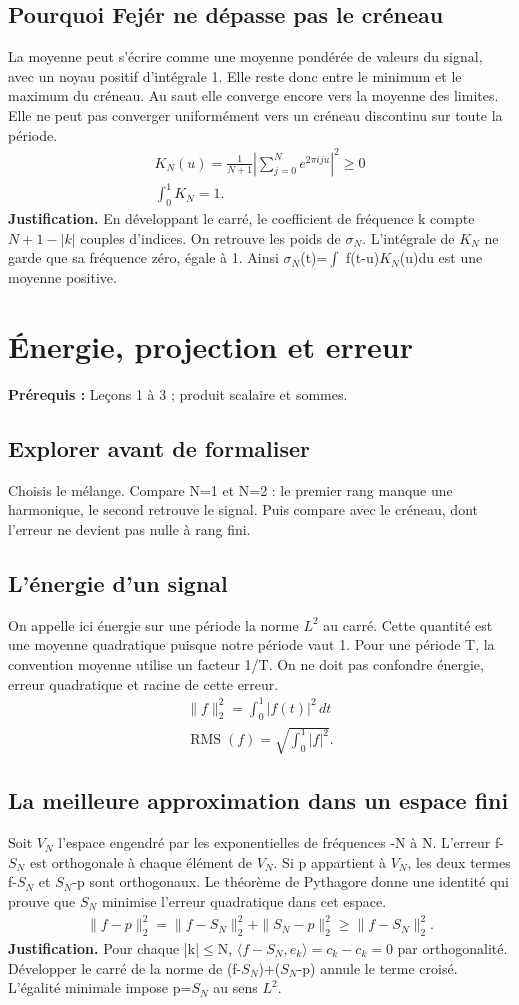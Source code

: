 \documentclass[11pt,a4paper]{article}
\begin{document}
\subsection{Pourquoi Fejér ne dépasse pas le créneau}
La moyenne peut s’écrire comme une moyenne pondérée de valeurs du signal, avec un noyau positif d’intégrale 1. Elle reste donc entre le minimum et le maximum du créneau. Au saut elle converge encore vers la moyenne des limites. Elle ne peut pas converger uniformément vers un créneau discontinu sur toute la période.
\[\begin{gathered}K_N(u)=\frac1{N+1}\left|\sum_{j=0}^{N}e^{2\pi iju}\right|^2\ge0\\\int_0^1K_N=1.\end{gathered}\]
\textbf{Justification.} En développant le carré, le coefficient de fréquence k compte $N+1-|k|$ couples d’indices. On retrouve les poids de $\sigma_N$. L’intégrale de $K_N$ ne garde que sa fréquence zéro, égale à 1. Ainsi $\sigma_N$(t)=$\int$ f(t-u)$K_N$(u)du est une moyenne positive.
\clearpage
\section{Énergie, projection et erreur}
\textbf{Prérequis :} Leçons 1 à 3 ; produit scalaire et sommes.
\subsection*{Explorer avant de formaliser}Choisis le mélange. Compare N=1 et N=2 : le premier rang manque une harmonique, le second retrouve le signal. Puis compare avec le créneau, dont l’erreur ne devient pas nulle à rang fini.
\subsection{L’énergie d’un signal}
On appelle ici énergie sur une période la norme $L^2$ au carré. Cette quantité est une moyenne quadratique puisque notre période vaut 1. Pour une période T, la convention moyenne utilise un facteur 1/T. On ne doit pas confondre énergie, erreur quadratique et racine de cette erreur.
\[\begin{gathered}\|f\|_2^2=\int_0^1|f(t)|^2\,dt\\ \operatorname{RMS}(f)=\sqrt{\int_0^1|f|^2}.\end{gathered}\]
\subsection{La meilleure approximation dans un espace fini}
Soit $V_N$ l’espace engendré par les exponentielles de fréquences -N à N. L’erreur f-$S_N$ est orthogonale à chaque élément de $V_N$. Si p appartient à $V_N$, les deux termes f-$S_N$ et $S_N$-p sont orthogonaux. Le théorème de Pythagore donne une identité qui prouve que $S_N$ minimise l’erreur quadratique dans cet espace.
\[\begin{gathered}\|f-p\|_2^2=\|f-S_N\|_2^2+\|S_N-p\|_2^2\ge\|f-S_N\|_2^2.\end{gathered}\]
\textbf{Justification.} Pour chaque |k|$\le$N, $\langle f-S_N,e_k\rangle=c_k-c_k=0$ par orthogonalité. Développer le carré de la norme de (f-$S_N$)+($S_N$-p) annule le terme croisé. L’égalité minimale impose p=$S_N$ au sens $L^2$.
\end{document}

